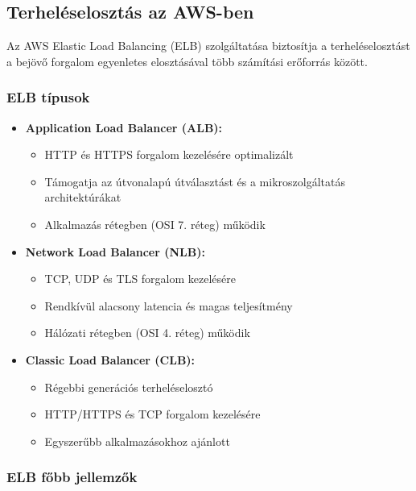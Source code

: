 \documentclass[a4paper,12pt]{article}
\begin{document}
    \subsection{Terheléselosztás az AWS-ben}

    Az AWS Elastic Load Balancing (ELB) szolgáltatása biztosítja a terheléselosztást a bejövő forgalom egyenletes elosztásával több számítási erőforrás között.

    \subsubsection{ELB típusok}

    \begin{itemize}
        \item \textbf{Application Load Balancer (ALB):}
        \begin{itemize}
            \item HTTP és HTTPS forgalom kezelésére optimalizált
            \item Támogatja az útvonalapú útválasztást és a mikroszolgáltatás architektúrákat
            \item Alkalmazás rétegben (OSI 7. réteg) működik
        \end{itemize}

        \item \textbf{Network Load Balancer (NLB):}
        \begin{itemize}
            \item TCP, UDP és TLS forgalom kezelésére
            \item Rendkívül alacsony latencia és magas teljesítmény
            \item Hálózati rétegben (OSI 4. réteg) működik
        \end{itemize}

        \item \textbf{Classic Load Balancer (CLB):}
        \begin{itemize}
            \item Régebbi generációs terheléselosztó
            \item HTTP/HTTPS és TCP forgalom kezelésére
            \item Egyszerűbb alkalmazásokhoz ajánlott
        \end{itemize}
    \end{itemize}

    \subsubsection{ELB főbb jellemzők}
\end{document}
